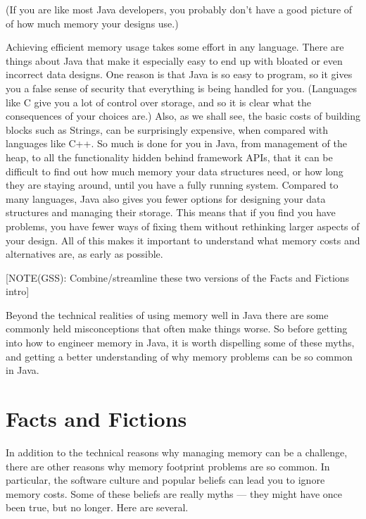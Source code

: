 (If you are like most Java developers, you probably don't have a good picture of
of how much memory your designs use.)

Achieving efficient memory usage takes some effort in any language. 
There are things about Java that make it especially easy to end up with bloated
or even incorrect data designs. One reason is that Java is so easy to program,
so it gives you a false sense of security that everything is being handled for you. (Languages like C give you a
lot of control over storage, and so it is clear what
the consequences of your choices are.) Also, as we shall see,
the basic costs of building blocks such as Strings, can be surprisingly expensive,
when compared with languages like C++. So much is done for you in
Java, from management of the heap, to all the functionality hidden behind framework APIs, that it can be
difficult to find out how much memory your data structures need, or how long
they are staying around, until you have a fully running system. Compared to
many languages, Java also gives you fewer options for designing your data
structures and managing their storage. This means that if you find you have
problems, you have fewer ways of fixing them without rethinking larger aspects of your design.
All of this makes it important to understand what memory
costs and alternatives are, as early as possible.

[NOTE(GSS): Combine/streamline these two versions of the Facts and Fictions
intro]

Beyond the technical realities of using memory well in Java there are some commonly held
misconceptions that often make things worse. So before getting into how to engineer memory in Java, it is worth dispelling some
of these myths, and getting a better understanding of why memory problems
can be so common in Java.

\section{Facts and Fictions}

In addition to the technical reasons why managing memory can be a challenge, there
are other reasons why memory footprint problems are so common. In particular,
the software culture and popular beliefs can lead you to ignore memory
costs. Some of these beliefs are really myths --- they might have once
been true, but no longer. Here are several.

